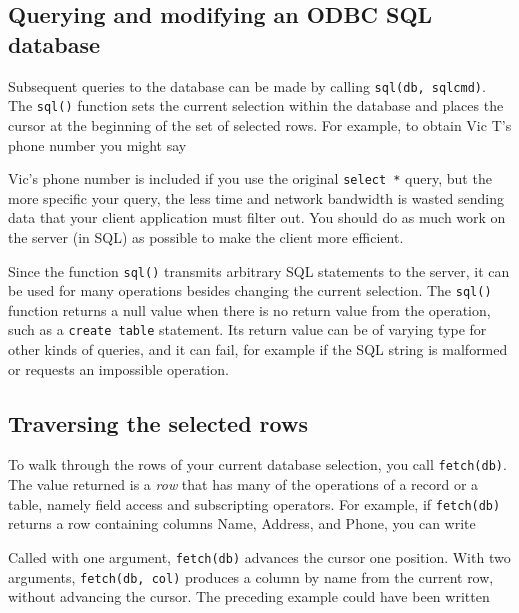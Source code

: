 \subsection*{Querying and modifying an ODBC SQL database}

Subsequent queries to the database can be made by calling
\texttt{sql(db, sqlcmd)}. The \texttt{sql()} function sets
the current selection within the database and places the cursor at the
beginning of the set of selected rows. For example, to obtain Vic
T's phone number you might say


Vic's phone number is included if you use the original
\texttt{select *} query, but the more specific your query, the less
time and network bandwidth is wasted sending data that your client
application must filter out. You should do as much work on the server
(in SQL) as possible to make the client more efficient.

Since the function \texttt{sql()} transmits arbitrary SQL statements to
the server, it can be used for many operations besides changing the
current selection. The \texttt{sql()} function returns a null value
when there is no return value from the operation, such as a
\texttt{create table} statement. Its return value can be of varying
type for other kinds of queries, and it can fail, for example if the
SQL string is malformed or requests an impossible operation.

\subsection*{Traversing the selected rows}

To walk through the rows of your current database selection, you call
\texttt{fetch(db)}. The value returned is a
\textit{row} that has many of the operations of a record or a table,
namely field access and subscripting operators. For example, if
\texttt{fetch(db)} returns a row containing columns Name, Address, and
Phone, you can write


\noindent
Called with one argument, \texttt{fetch(db)} advances the cursor
one position. With two arguments, \texttt{fetch(db, col)} produces a
column by name from the current row, without advancing the cursor.
The preceding example could have been written


